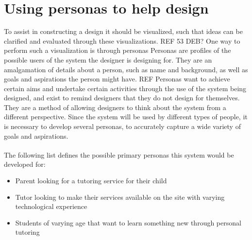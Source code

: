 \section{Using personas to help design}
To assist in constructing a design it should be visualized, such that ideas can be clarified and evaluated through these visualizations. REF 53 DEB?
One way to perform such a visualization is through personas
Personas are profiles of the possible users of the system the designer is designing for.
They are an amalgamation of details about a person, such as name and background, as well as goals and aspirations the person might have. REF
Personas want to achieve certain aims and undertake certain activities through the use of the system being designed, and exist to remind designers that they do not design for themselves.
They are a method of allowing designers to think about the system from a different perspective.
Since the system will be used by different types of people, it is necessary to develop several personas, to accurately capture a wide variety of goals and aspirations.
\\\\
The following list defines the possible primary personas this system would be developed for:
\begin{itemize}
    \item Parent looking for a tutoring service for their child
    \item Tutor looking to make their services available on the site with varying technological experience
    \item Students of varying age that want to learn something new through personal tutoring
\end{itemize}

